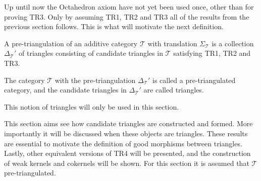     Up until now the Octahedron axiom have not yet been used once, other than for proving TR3. Only by assuming TR1, TR2 and TR3 all of the results from the previous section follows. This is what will motivate the next definition.

    \begin{definition}
        A pre-triangulation of an additive category $\mathcal{T}$ with translation $\Sigma_{\mathcal{T}}$ is a collection $\Delta_{\mathcal{T}}'$ of triangles consisting of candidate triangles in $\mathcal{T}$ satisfying TR1, TR2 and TR3.

        The category $\mathcal{T}$ with the pre-triangulation $\Delta_{\mathcal{T}}'$ is called a pre-triangulated category, and the candidate triangles in $\Delta_{\mathcal{T}}'$ are called  triangles.
    \end{definition}

    \begin{remark}
        This notion of triangles will only be used in this section.
    \end{remark}

    This section aims see how candidate triangles are constructed and formed. More importantly it will be discussed when these objects are triangles. These results are essential to motivate the definition of good morphisms between triangles. Lastly, other equivalent versions of TR4 will be presented, and the construction of weak kernels and cokernels will be shown. For this section it is assumed that $\mathcal{T}$ pre-triangulated.

